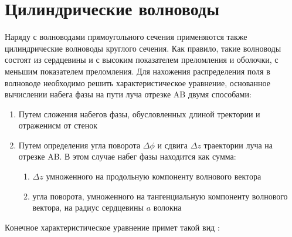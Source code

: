 \section{Цилиндрические волноводы}
Наряду с волноводами прямоугольного сечения применяются также цилиндрические волноводы круглого сечения. Как правило, такие волноводы состоят из сердцевины и с высоким показателем преломления и оболочки, с меньшим показателем преломления. Для нахожения распределения поля в волноводе необходимо решить характеристическое уравнение, основанное вычислении набега фазы на пути луча отрезке AB двумя способами:
\begin{enumerate} 
	\item Путем сложения набегов фазы, обусловленных длиной тректории и отраженисм от стенок 
	\item Путем определения угла поворота $\Delta \phi$ и сдвига $\Delta z$ траектории луча на отрезке AB. В этом случае набег фазы находится как сумма:
	\begin{enumerate} 
		\item $\Delta z$ умноженного на продольную компоненту волнового вектора
		\item угла поворота, умноженного на тангенциальную компоненту волнового вектора, на радиус сердцевины $a$ волокна
	\end{enumerate}
\end{enumerate}

Конечное характеристическое уравнение примет такой вид \cite{adams}: